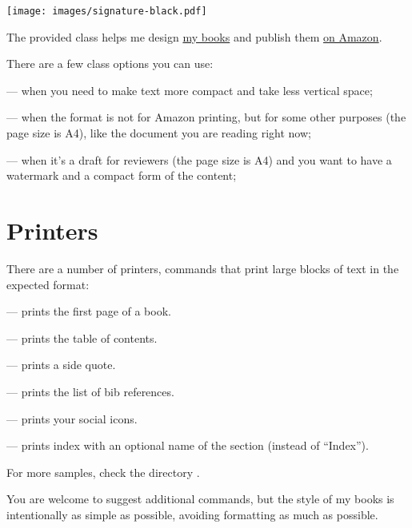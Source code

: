 \documentclass[compact,manuscript]{./ybook}
\begin{document}
\texttt{[image: images/signature-black.pdf]}
\vspace*{24pt}

\maketitle

The provided class  helps me design
\href{https://www.yegor256.com/books.html}{my books} and
publish them
\href{https://www.amazon.com/Yegor-Bugayenko/e/B01AM1QMDK}{on Amazon}.

There are a few class options you can use:

 --- when you need to make text more compact
and take less vertical space;

 --- when the format is not for Amazon printing,
but for some other purposes (the page size is A4), like the document
you are reading right now;

 --- when it's a draft for reviewers (the page size is A4)
and you want to have a watermark and a compact form of the content;

\section*{Printers}

There are a number of printers, commands that print large blocks of text
in the expected format:

 --- prints the first page of a book.

 --- prints the table of contents.

 --- prints a side quote.

 --- prints the list of bib references.

 --- prints your social icons.

 --- prints index with an optional name of the section (instead of ``Index'').

For more samples, check the directory .

You are welcome to suggest additional commands, but the style
of my books is intentionally as simple as possible, avoiding formatting
as much as possible.
\end{document}
